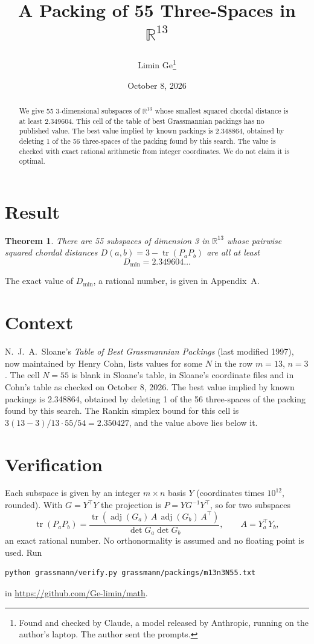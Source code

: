 \documentclass[11pt,a4paper]{article}
\title{A Packing of 55 Three-Spaces in $\mathbb{R}^{13}$}
\author{Limin Ge\thanks{Found and checked by Claude, a model released by Anthropic, running on the author's laptop. The author sent the prompts.}}
\date{October 8, 2026}
\newtheorem*{theorem}{Theorem}
\begin{document}
\maketitle
\begin{abstract}
We give 55 3-dimensional subspaces of $\mathbb{R}^{13}$ whose smallest squared chordal distance is at least 2.349604. This cell of the table of best Grassmannian packings has no published value. The best value implied by known packings is 2.348864, obtained by deleting 1 of the 56 three-spaces of the packing found by this search. The value is checked with exact rational arithmetic from integer coordinates. We do not claim it is optimal.
\end{abstract}

\section{Result}
\begin{theorem}
There are 55 subspaces of dimension 3 in $\mathbb{R}^{13}$ whose pairwise squared chordal distances $D(a,b) = 3 - \operatorname{tr}(P_aP_b)$ are all at least
\[ D_{\min} = 2.349604\ldots \]
\end{theorem}
The exact value of $D_{\min}$, a rational number, is given in Appendix~A.


\section{Context}
N.~J.~A.~Sloane's \emph{Table of Best Grassmannian Packings} (last modified 1997), now maintained by Henry Cohn, lists values for some $N$ in the row $m=13$, $n=3$. The cell $N=55$ is blank in Sloane's table, in Sloane's coordinate files and in Cohn's table as checked on October 8, 2026. The best value implied by known packings is 2.348864, obtained by deleting 1 of the 56 three-spaces of the packing found by this search. The Rankin simplex bound for this cell is $3(13-3)/13\cdot 55/54 = 2.350427$, and the value above lies below it.


\section{Verification}
Each subspace is given by an integer $m\times n$ basis $Y$ (coordinates times $10^{12}$, rounded). With $G=Y^\top Y$ the projection is $P=YG^{-1}Y^\top$, so for two subspaces
\[ \operatorname{tr}(P_aP_b)=\frac{\operatorname{tr}(\operatorname{adj}(G_a)\,A\,\operatorname{adj}(G_b)\,A^\top)}{\det G_a\det G_b},\qquad A=Y_a^\top Y_b, \]
an exact rational number. No orthonormality is assumed and no floating point is used. Run
\begin{verbatim}
python grassmann/verify.py grassmann/packings/m13n3N55.txt
\end{verbatim}
in \url{https://github.com/Ge-limin/math}.
\end{document}
